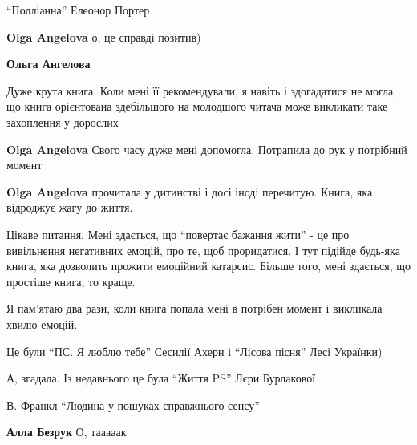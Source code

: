  
 
 
 
 

\qqSecCmt


\enquote{Полліанна} Елеонор Портер

\begin{itemize} %
\textbf{Olga Angelova} о, це справді позитив)

\textbf{Ольга Ангелова} 

Дуже крута книга. Коли мені її рекомендували, я навіть і здогадатися не могла,
що книга орієнтована здебільшого на молодшого читача може викликати таке
захоплення у дорослих

\textbf{Olga Angelova} Свого часу дуже мені допомогла. Потрапила до рук у потрібний момент

\textbf{Olga Angelova} прочитала у дитинстві і досі іноді перечитую. Книга, яка відроджує жагу до життя.
\end{itemize} %


Цікаве питання. Мені здається, що \enquote{повертає бажання жити} - це про вивільнення
негативних емоцій, про те, щоб проридатися. І тут підійде будь-яка книга, яка
дозволить прожити емоційний катарсис. Більше того, мені здається, що простіше
книга, то краще.

Я пам'ятаю два рази, коли книга попала мені в потрібен момент і викликала хвилю емоцій.

Це були \enquote{ПС. Я люблю тебе} Сесилії Ахерн і \enquote{Лісова пісня} Лесі Українки)

А, згадала. Із недавнього це була \enquote{Життя PS} Лєри Бурлакової


В. Франкл \enquote{Людина у пошуках справжнього сенсу}

\begin{itemize} %
\textbf{Алла Безрук} О, тааааак
\end{itemize} %

